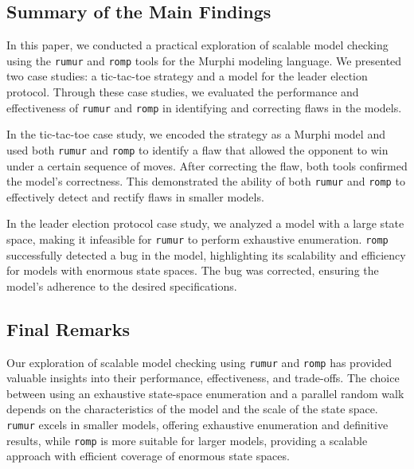 
\subsection{Summary of the Main Findings}\label{subsec:summary-of-the-main-findings}

In this paper, we conducted a practical exploration of scalable model
checking using the \texttt{rumur} and \texttt{romp} tools for the Murphi
modeling language.
We presented two case studies: a tic-tac-toe strategy and a model for the
leader election protocol.
Through these case studies, we evaluated the performance and effectiveness of
\texttt{rumur} and \texttt{romp} in identifying and correcting flaws in the
models.

In the tic-tac-toe case study, we encoded the strategy as a Murphi model and
used both \texttt{rumur} and \texttt{romp} to identify a flaw that allowed
the opponent to win under a certain sequence of moves.
After correcting the flaw, both tools confirmed the model's correctness.
This demonstrated the ability of both \texttt{rumur} and \texttt{romp} to
effectively detect and rectify flaws in smaller models.

In the leader election protocol case study,
we analyzed a model with a large state space,
making it infeasible for \texttt{rumur} to perform exhaustive enumeration.
\texttt{romp} successfully detected a bug in the model,
highlighting its scalability and efficiency for models with enormous
state spaces.
The bug was corrected, ensuring the model's adherence to the desired
specifications.

\subsection{Final Remarks}\label{subsec:final-remarks}

Our exploration of scalable model checking using \texttt{rumur} and
\texttt{romp} has provided valuable insights into their performance,
effectiveness, and trade-offs.
The choice between using an exhaustive state-space enumeration and
a parallel random walk depends on the characteristics of the model and the
scale of the state space.
\texttt{rumur} excels in smaller models, offering exhaustive enumeration and
definitive results, while \texttt{romp} is more suitable for larger models,
providing a scalable approach with efficient coverage of enormous state spaces.

